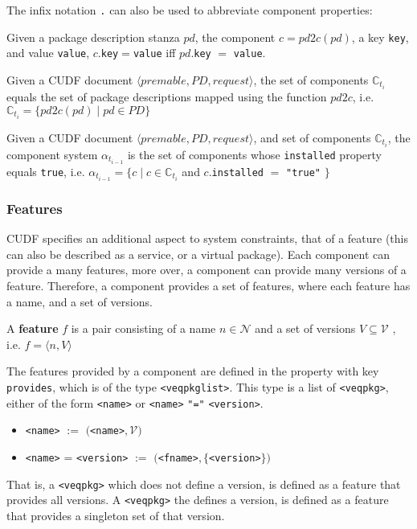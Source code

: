 The infix notation \texttt{.} can also be used to abbreviate component properties: 
\begin{defs}
Given a package description stanza $pd$,  the component $c = pd2c(pd)$, a key \texttt{key}, and value \texttt{value}, 
$c$.\texttt{key}$ = $\texttt{value} iff $pd$.\texttt{key} $ = $ \texttt{value}.
\end{defs}

\begin{defs}
Given a CUDF document $\langle premable, PD, request \rangle$, the set of components $\mathbb{C}_{t_i}$ equals the set of package descriptions mapped using the function $pd2c$,
i.e. $\mathbb{C}_{t_i} = \{pd2c(pd) \mid pd \in PD\}$
\end{defs}

\begin{defs}
Given a CUDF document $\langle premable, PD, request \rangle$, and set of components $\mathbb{C}_{t_i}$,
the component system $\alpha_{t_{i-1}}$ is the set of components whose \texttt{installed} property equals \texttt{true},
i.e. $\alpha_{t_{i-1}} = \{c \mid c \in \mathbb{C}_{t_i} $ and $ c.$\texttt{installed} $=$ \texttt{"true"} $\}$
\end{defs}

\subsubsection{Features}
CUDF specifies an additional aspect to system constraints, that of a feature (this can also be described as a service, or a virtual package).
Each component can provide a many features, more over, a component can provide many versions of a feature.
Therefore, a component provides a set of features, where each feature has a name, and a set of versions.

\begin{defs}
A \textbf{feature} $f$ is a pair consisting of a name $n \in \mathcal{N}$ and a set of versions $V \subseteq \mathcal{V}$ , 
i.e. $f = \langle n,V \rangle$
\end{defs}

The features provided by a component are defined in the property with key \verb+provides+, which is of the type \texttt{<veqpkglist>}.
This type is a list of \texttt{<veqpkg>}, either of the form \verb+<name>+ or  \verb+<name>+ \texttt{"="} \verb+<version>+.
\begin{itemize}
  \item \verb+<name>+ $:=$ $($\verb+<name>+$,\mathcal{V})$
  \item \verb+<name>+ = \verb+<version>+ $:=$ $($\verb+<fname>+$,\{$\verb+<version>+$\})$
\end{itemize}
That is, a \texttt{<veqpkg>} which does not define a version, is defined as a feature that provides all versions.
A  \texttt{<veqpkg>} the defines a version, is defined as a feature that provides a singleton set of that version.

